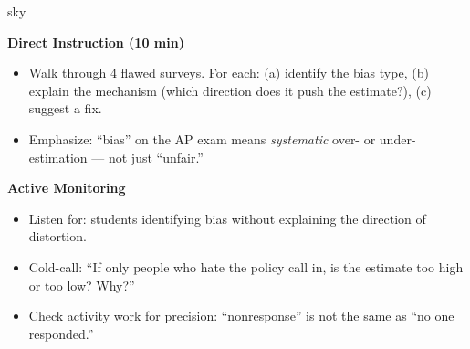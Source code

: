 \documentclass[10pt]{article}
\begin{document}
\begin{skillbox}{sky}
\begin{minipage}[t]{0.48\linewidth}
    \textbf{Direct Instruction (10 min)}
    \begin{itemize}
        \item Walk through 4 flawed surveys. For each: (a) identify the bias type,
              (b) explain the mechanism (which direction does it push the estimate?),
              (c) suggest a fix.
        \item Emphasize: ``bias'' on the AP exam means \emph{systematic}
              over- or under-estimation --- not just ``unfair.''
    \end{itemize}
\end{minipage}
\hfill
\begin{minipage}[t]{0.48\linewidth}
    \textbf{Active Monitoring}
    \begin{itemize}
        \item Listen for: students identifying bias without explaining the direction
              of distortion.
        \item Cold-call: ``If only people who hate the policy call in, is the estimate
              too high or too low? Why?''
        \item Check activity work for precision: ``nonresponse'' is not the same as
              ``no one responded.''
    \end{itemize}
\end{minipage}
\end{skillbox}
\end{document}
